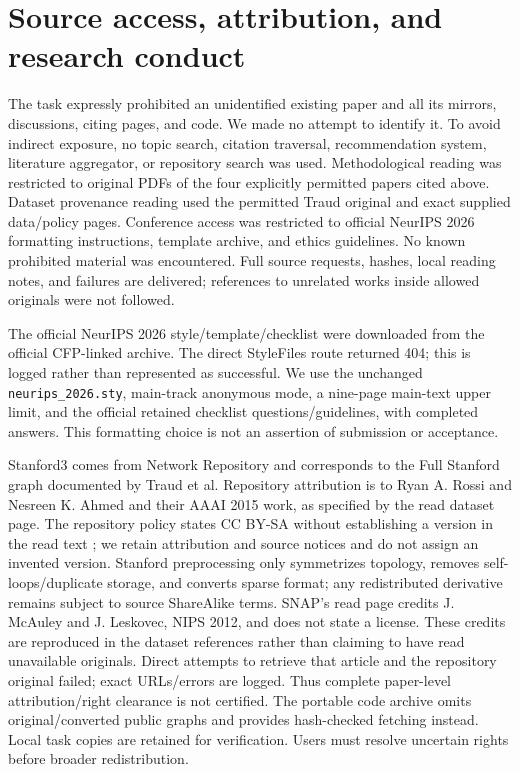 \documentclass{article}
\begin{document}
\section{Source access, attribution, and research conduct}\label{app:access}
The task expressly prohibited an unidentified existing paper and all its mirrors, discussions, citing pages, and code. We made no attempt to identify it. To avoid indirect exposure, no topic search, citation traversal, recommendation system, literature aggregator, or repository search was used. Methodological reading was restricted to original PDFs of the four explicitly permitted papers cited above. Dataset provenance reading used the permitted Traud original and exact supplied data/policy pages. Conference access was restricted to official NeurIPS 2026 formatting instructions, template archive, and ethics guidelines. No known prohibited material was encountered. Full source requests, hashes, local reading notes, and failures are delivered; references to unrelated works inside allowed originals were not followed.

The official NeurIPS 2026 style/template/checklist were downloaded from the official CFP-linked archive. The direct StyleFiles route returned 404; this is logged rather than represented as successful. We use the unchanged \texttt{neurips\_2026.sty}, main-track anonymous mode, a nine-page main-text upper limit, and the official retained checklist questions/guidelines, with completed answers. This formatting choice is not an assertion of submission or acceptance.

Stanford3 comes from Network Repository and corresponds to the Full Stanford graph documented by Traud et al. Repository attribution is to Ryan A. Rossi and Nesreen K. Ahmed and their AAAI 2015 work, as specified by the read dataset page. The repository policy states CC BY-SA without establishing a version in the read text \citep{nrpolicy}; we retain attribution and source notices and do not assign an invented version. Stanford preprocessing only symmetrizes topology, removes self-loops/duplicate storage, and converts sparse format; any redistributed derivative remains subject to source ShareAlike terms. SNAP's read page credits J. McAuley and J. Leskovec, NIPS 2012, and does not state a license. These credits are reproduced in the dataset references rather than claiming to have read unavailable originals. Direct attempts to retrieve that article and the repository original failed; exact URLs/errors are logged. Thus complete paper-level attribution/right clearance is not certified. The portable code archive omits original/converted public graphs and provides hash-checked fetching instead. Local task copies are retained for verification. Users must resolve uncertain rights before broader redistribution.
\end{document}
